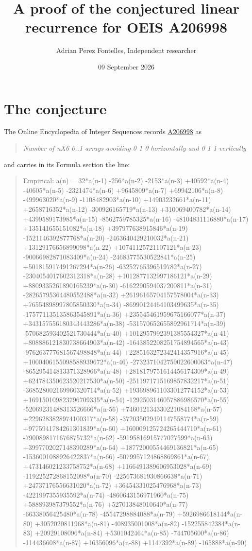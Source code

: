 \documentclass[11pt]{article}
\title{A proof of the conjectured linear recurrence for OEIS A206998}
\author{Adrian Perez Fontelles, Independent researcher}
\date{09 September 2026}
\theoremstyle{definition}
\begin{document}
\maketitle
\section{The conjecture}

The Online Encyclopedia of Integer Sequences records \href{https://oeis.org/A206998}{A206998} as

\begin{quote}\itshape Number of nX6 0..1 arrays avoiding 0 1 0 horizontally and 0 1 1 vertically\end{quote}

and carries in its Formula section the line:

\begin{quote}\ttfamily Empirical: a(n) = 32*a(n-1) -256*a(n-2) -2153*a(n-3) +40592*a(n-4) -40605*a(n-5) -2321474*a(n-6) +9645809*a(n-7) +69942106*a(n-8) -499963020*a(n-9) -1108482903*a(n-10) +14903232661*a(n-11) +2658716352*a(n-12) -300926165719*a(n-13) +310069400782*a(n-14) +4399589173985*a(n-15) -8562759785325*a(n-16) -48104831116880*a(n-17) +135141655151082*a(n-18) +397977638915846*a(n-19) -1521146392877768*a(n-20) -2463640429210032*a(n-21) +13129176656899098*a(n-22) +10741125721107121*a(n-23) -90066982871083409*a(n-24) -24683775530522841*a(n-25) +501815917491267294*a(n-26) -63252765396519782*a(n-27) -2304054017602312318*a(n-28) +1012877132997186121*a(n-29) +8809335261890165239*a(n-30) -6162290594037200811*a(n-31) -28265795364480552488*a(n-32) +26196165704157578004*a(n-33) +76554898997805850330*a(n-34) -86990124464103499635*a(n-35) -175771135135863545891*a(n-36) +235545461959675166077*a(n-37) +343157556180343443286*a(n-38) -531570652655892961714*a(n-39) -570682593402521730444*a(n-40) +1012957992391385554327*a(n-41) +808886121830738664903*a(n-42) -1643852208251754894565*a(n-43) -976263777681567498848*a(n-44) +2285163272342414357916*a(n-45) +1000406155098588939672*a(n-46) -2732371042759022600063*a(n-47) -865295414813371328966*a(n-48) +2818179751614456174309*a(n-49) +624784350623520217530*a(n-50) -2511971715169857832217*a(n-51) -368528002169960320714*a(n-52) +1936989611033012774152*a(n-53) +169150109823796709335*a(n-54) -1292503146057886986570*a(n-55) -52069231488313526666*a(n-56) +746012134330221084168*a(n-57) +2296283828974100317*a(n-58) -372035029491147558774*a(n-59) +9775941784261301839*a(n-60) +160009125724265444710*a(n-61) -7900898171676875732*a(n-62) -59195816915777027599*a(n-63) +3997702027148390289*a(n-64) +18772000554469136821*a(n-65) -1536001088926422837*a(n-66) -5079957124868869861*a(n-67) +473146021233758752*a(n-68) +1166491389606953028*a(n-69) -119225272868152098*a(n-70) -225673681930866638*a(n-71) +24737176556631020*a(n-72) +36454331025476968*a(n-73) -4221997355935592*a(n-74) -4860643156971960*a(n-75) +588893987379552*a(n-76) +527013848010640*a(n-77) -66338056425480*a(n-78) -45547298884088*a(n-79) +5926986618144*a(n-80) +3052020811968*a(n-81) -408935001008*a(n-82) -152255842384*a(n-83) +20929108096*a(n-84) +5301042464*a(n-85) -744705600*a(n-86) -114436608*a(n-87) +16356096*a(n-88) +1147392*a(n-89) -165888*a(n-90)\end{quote}
\end{document}
